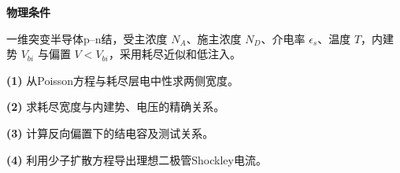 \textbf{物理条件}\par 一维突变半导体p–n结，受主浓度 \(N_A\)、施主浓度 \(N_D\)、介电率 \(\epsilon_s\)、温度 \(T\)，内建势 \(V_{bi}\) 与偏置 \(V<V_{bi}\)，采用耗尽近似和低注入。
\par\noindent\textbf{(1)} 从Poisson方程与耗尽层电中性求两侧宽度。
\par\noindent\textbf{(2)} 求耗尽宽度与内建势、电压的精确关系。
\par\noindent\textbf{(3)} 计算反向偏置下的结电容及测试关系。
\par\noindent\textbf{(4)} 利用少子扩散方程导出理想二极管Shockley电流。
